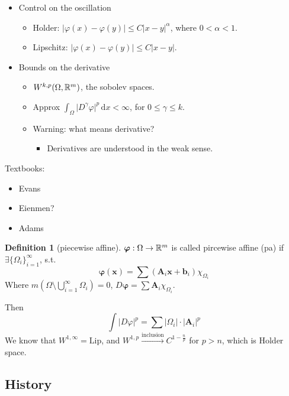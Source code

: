 \documentclass{amsart}
\let\originalmathbb\mathbb
\renewcommand{\mathbb}[1]{%
    \ifstrequal{#1}{1}{\mathbbm{#1}}{\originalmathbb{#1}}%
}
\theoremstyle{plain}
\theoremstyle{definition}
\newtheorem{definition}[theorem]{Definition}
\theoremstyle{remark}
\begin{document}
\begin{itemize}
	\item Control on the oscillation
	\begin{itemize}
		\item Holder: $\lvert \varphi(x)-\varphi(y) \rvert\leq C\lvert x-y \rvert ^{\alpha}$, where $0<\alpha<1$.
		\item Lipschitz:  $\lvert \varphi(x)-\varphi(y) \rvert\leq C\lvert x-y \rvert$.
	\end{itemize}
	\item Bounds on the derivative
	\begin{itemize}
		\item $W^{k,p}(\Omega,\mathbb{R}^{m})$, the sobolev spaces.
		\item Approx $\int_{\Omega}^{} \lvert D^{\gamma} \varphi\rvert ^{p} \, \mathrm{d}x<\infty$, for $0\leq\gamma\leq k$.
		\item Warning: what means derivative?
		\begin{itemize}
			\item Derivatives are understood in the weak sense.
		\end{itemize}
	\end{itemize}
\end{itemize}

Textbooks:

\begin{itemize}
	\item Evans
	\item Eienmen?
	\item Adams
\end{itemize}

\begin{definition}[piecewise affine]
$\boldsymbol{\varphi}:\Omega\to \mathbb{R}^{m}$ is called pircewise affine (pa) if $\exists \{ \Omega _i \}^{\infty}_{i=1}$, s.t.
\[
\boldsymbol{\varphi}(\mathbf{x})=\sum(\mathbf{A}_i \mathbf{x}+\mathbf{b}_i)\chi_{\Omega _i}
\]
Where $m\left( \Omega\setminus \bigcup_{i=1}^{\infty}\Omega _i \right)=0$, $D\boldsymbol{\varphi}=\sum \mathbf{A}_i\chi_{\Omega _i}$.
\end{definition}
Then
\[
\int \lvert D\varphi \rvert ^{p}=\sum \lvert \Omega _i \rvert \cdot \lvert \mathbf{A}_i \rvert ^{p}
\]
We know that $W^{1,\infty}=\text{Lip}$, and $W^{1,p}\overset{ \text{inclusion} }{ \to } C^{1-\frac{n}{p}}$ for $p>n$, which is Holder space.

\subsection{History}
\end{document}
